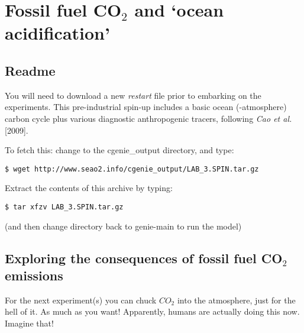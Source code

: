 \documentclass[11pt,fleqn]{book} %
\begin{document}
\chapter{Fossil fuel CO$_{2}$ and ‘ocean acidification’}\label{ch:fossil-fuel-co2}

\hfill \break


\newpage


\section*{Readme}

You will need to download a new \textit{restart} file prior to embarking on the experiments. This pre-industrial spin-up includes a basic ocean (-atmosphere) carbon cycle plus various diagnostic anthropogenic tracers, following \textit{Cao et al.} [2009].

\vspace{1mm}
\noindent To fetch this: change to the \textsf{\footnotesize cgenie\_output} directory, and type:
\vspace{-2mm}
\begin{verbatim}
$ wget http://www.seao2.info/cgenie_output/LAB_3.SPIN.tar.gz
\end{verbatim}
\vspace{-2mm}

\noindent Extract the contents of this archive by typing:
\vspace{-2mm}
\begin{verbatim}
$ tar xfzv LAB_3.SPIN.tar.gz
\end{verbatim}
\vspace{-2mm}
\noindent (and then change directory back to \textsf{\footnotesize genie-main} to run the model)


\newpage


\section{Exploring the consequences of fossil fuel CO$_{2}$ emissions}

For the next experiment(s) you can chuck \(CO_{2}\) into the atmosphere, just for the hell of it. As much as you want! Apparently, humans are actually doing this now. Imagine that!
\end{document}
